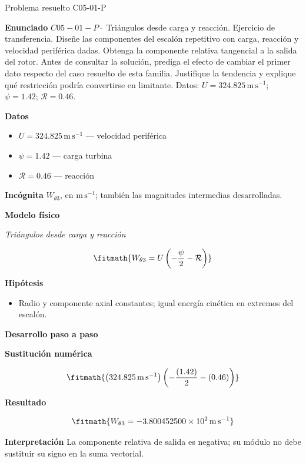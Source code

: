 \documentclass[10pt,openany]{book}
\begin{document}
\begin{studiumworked}{Problema resuelto C05-01-P}


\noindent\textbf{Enunciado}
\(C05-01-P \cdot\) Triángulos desde carga y reacción. Ejercicio de transferencia. Diseñe las componentes del escalón repetitivo con carga, reacción y velocidad periférica dadas. Obtenga la componente relativa tangencial a la salida del rotor. Antes de consultar la solución, prediga el efecto de cambiar el primer dato respecto del caso resuelto de esta familia. Justifique la tendencia y explique qué restricción podría convertirse en limitante. Datos: \(U=324.825\, \mathrm{m}\,\mathrm{s}^{-1}\); \(\psi=1.42\); \(\mathcal R=0.46\).

\noindent\textbf{Datos}
\begin{itemize}
\item $U = 324.825\,\mathrm{m}\,\mathrm{s}^{-1}$ — velocidad periférica
\item $\psi = 1.42$ — carga turbina
\item $\mathcal R = 0.46$ — reacción
\end{itemize}

\noindent\textbf{Incógnita}
$W_{\theta 3}$, en $\mathrm{m\,s^{-1}}$; también las magnitudes intermedias desarrolladas.

\noindent\textbf{Modelo físico}

\noindent\textit{Triángulos desde carga y reacción}

\[
\fitmath{W_{\theta 3}=U \left(- \frac{\psi}{2} - \mathcal R\right)}
\]

\noindent\textbf{Hipótesis}
\begin{itemize}
\item Radio y componente axial constantes; igual energía cinética en extremos del escalón.
\end{itemize}

\noindent\textbf{Desarrollo paso a paso}



\noindent\textbf{Sustitución numérica}

\[
\fitmath{\left(324.825\,\mathrm{m}\,\mathrm{s}^{-1}\right) \left(- \frac{\left(1.42\right)}{2} - \left(0.46\right)\right)}
\]

\noindent\textbf{Resultado}

\[
\fitmath{W_{\theta 3}=-3.800452500\times10^{2}\,\mathrm{m}\,\mathrm{s}^{-1}}
\]

\noindent\textbf{Interpretación}
La componente relativa de salida es negativa; su módulo no debe sustituir su signo en la suma vectorial.


\end{studiumworked}
\end{document}
